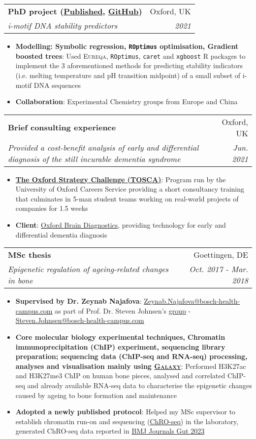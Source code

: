 \documentclass[legalpaper,11pt]{article}
\makeatletter
\newcommand{\resumeItem}[2]{
  \item\small{
    \textbf{#1}{: #2 \vspace{-2pt}}
  }
}
\newcommand{\resumeSubheading}[4]{
  \vspace{-1pt}\item
    \begin{tabular*}{0.97\textwidth}[t]{l@{\extracolsep{\fill}}r}
      \textbf{#1} & #2 \\
      \textit{\small#3} & \textit{\small #4} \\
    \end{tabular*}\vspace{-5pt}
}
\newcommand{\resumeItemListStart}{\begin{itemize}}
\newcommand{\resumeItemListEnd}{\end{itemize}\vspace{-5pt}}
\makeatother
\begin{document}
     \resumeSubheading
      {PhD project (\href{https://doi.org/10.1002/anie.202016801}{Published}, \href{https://github.com/SahakyanLab/iMotif_dev}{GitHub})}{Oxford, UK}
      {i-motif DNA stability predictors}{2021}
      \resumeItemListStart
        \resumeItem{Modelling: Symbolic regression, \texttt{ROptimus} optimisation, Gradient boosted trees}
          {Used \textsc{Eureqa}, \texttt{ROptimus}, \texttt{caret} and \texttt{xgboost} R packages to implement the 3 aforementioned methods for predicting stability indicators (i.e. melting temperature and pH transition midpoint) of a small subset of i-motif DNA sequences}
          \resumeItem{Collaboration}{Experimental Chemistry groups from Europe and China}
     \resumeItemListEnd

     \resumeSubheading
      {Brief consulting experience}{Oxford, UK}
      {Provided a cost-benefit analysis of early and differential diagnosis of the still incurable dementia syndrome}{Jun. 2021}
      \resumeItemListStart
        \resumeItem{\href{https://www.careers.ox.ac.uk/oxford-strategy-challenge}{The Oxford Strategy Challenge (TOSCA)}}
          {Program run by the University of Oxford Careers Service providing a short consultancy training that culminates in 5-man student teams working on real-world projects of companies for 1.5 weeks}
        \resumeItem{Client}
          {\href{https://www.oxfordbraindiagnostics.com/}{Oxford Brain Diagnostics}, providing technology for early and differential dementia diagnosis}
      \resumeItemListEnd
     
     \resumeSubheading
      {MSc thesis}{Goettingen, DE}
      {Epigenetic regulation of ageing-related changes in bone}{Oct. 2017 - Mar. 2018}
      \resumeItemListStart
        \resumeItem{Supervised by Dr. Zeynab Najafova}{\href{mailto: Zeynab.Najafova@bosch-health-campus.com}{Zeynab.Najafova@bosch-health-campus.com} as part of Prof. Dr. Steven Johnsen's \href{https://johnsenlab.wordpress.com/}{group} - \href{mailto:Steven.Johnsen@bosch-health-campus.com}{Steven.Johnsen@bosch-health-campus.com}}
        \resumeItem{Core molecular biology experimental techniques, Chromatin immunoprecipitation (ChIP) experiment, sequencing library preparation; sequencing data (ChIP-seq and RNA-seq) processing, analyses and visualisation mainly using \href{https://usegalaxy.org/}{\textsc{Galaxy}}}{Performed H3K27ac and H3K27me3 ChIP on human bone pieces, analysed and correlated ChIP-seq and already available RNA-seq data to characterise the epigenetic changes caused by ageing to bone formation and maintenance}
        \resumeItem{Adopted a newly published protocol}{Helped my MSc supervisor to establish chromatin run-on and sequencing (\href{https://www.nature.com/articles/s41588-018-0244-3#data-availability}{ChRO-seq}) in the laboratory, generated ChRO-seq data reported in \href{http://dx.doi.org/10.1136/gutjnl-2022-328154}{BMJ Journals Gut 2023}}
     \resumeItemListEnd
\end{document}
